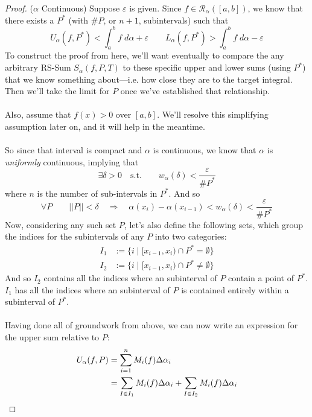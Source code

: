 \documentclass[12pt]{article}
\theoremstyle{plain}
\theoremstyle{definition}
\theoremstyle{remark}
\begin{document}
\begin{proof}($\alpha$ Continuous)
Suppose $\varepsilon$ is given. Since $f\in\mathscr{R}_\alpha([a,b])$, we know that there exists a $P^*$ (with $\#P$, or $n+1$, subintervals) such that 
\begin{equation}
    \label{bases}
    U_\alpha(f,P^*) < \int^b_a f\;d\alpha + \varepsilon
        \qquad L_\alpha(f,P^*) > \int^b_a f\;d\alpha - \varepsilon
\end{equation}
To construct the proof from here, we'll want eventually to compare the any arbitrary RS-Sum $S_\alpha(f,P,T)$ to these specific upper and lower sums (using $P^*$) that we know something about---i.e. how close they are to the target integral. Then we'll take the limit for $P$ once we've established that relationship.
\\
\\
Also, assume that $f(x)>0$ over $[a,b]$. We'll resolve this simplifying assumption later on, and it will help in the meantime.
\\
\\
So since that interval is compact and $\alpha$ is continuous, we know that $\alpha$ is \emph{uniformly} continuous, implying that
    \[ \exists \delta > 0 \quad \text{s.t.} \qquad 
    w_\alpha(\delta) < \frac{\varepsilon}{\#P^*} \]
where $n$ is the number of sub-intervals in $P^*$. And so 
    \[ \forall P \qquad ||P||<\delta \quad \Rightarrow 
        \quad \alpha(x_i) - \alpha(x_{i-1}) < w_\alpha(\delta)
        <  \frac{\varepsilon}{\#P^*} \]
Now, considering any such set $P$, let's also define the following sets, which group the indices for the subintervals of any $P$ into two categories:
\begin{align*}
    I_1 &:= \{i \; | \; [x_{i-1},x_i) \cap P^* = \emptyset \}\\
    I_2 &:= \{i \; | \; [x_{i-1},x_i) \cap P^* \neq \emptyset \}
\end{align*}
And so $I_2$ contains all the indices where an subinterval of $P$ contain a point of $P^*$. $I_1$ has all the indices where an subinterval of $P$ is contained entirely within a subinterval of $P^*$.
\\
\\
Having done all of groundwork from above, we can now write an expression for the upper sum relative to $P$:
\begin{align}
    U_\alpha(f,P) &= \sum^n_{i=1} M_i(f) \Delta\alpha_i \notag \\
        &= \sum_{I\in I_1} M_i(f) \Delta\alpha_i 
         + \sum_{I\in I_2} M_i(f) \Delta\alpha_i

\end{align}
\end{proof}
\end{document}
